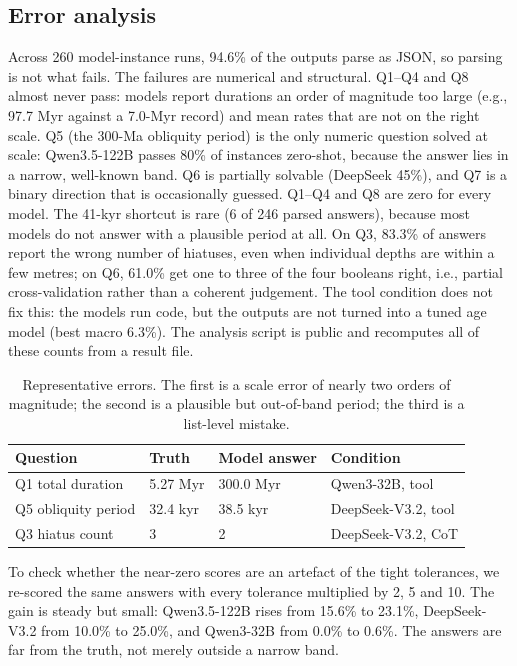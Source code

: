 \documentclass[10pt]{article}
\begin{document}
\subsection{Error analysis}
\label{sec:analysis}
Across 260 model-instance runs, 94.6\% of the outputs parse as JSON, so parsing is not what
fails. The failures are numerical and structural. Q1--Q4 and Q8 almost never pass: models
report durations an order of magnitude too large (e.g., 97.7 Myr against a 7.0-Myr record) and
mean rates that are not on the right scale. Q5 (the 300-Ma obliquity period) is the only numeric question
solved at scale: Qwen3.5-122B passes 80\% of instances zero-shot, because the answer lies in a
narrow, well-known band. Q6 is partially solvable (DeepSeek 45\%), and Q7 is a binary direction
that is occasionally guessed. Q1--Q4 and Q8 are zero for every model. The 41-kyr shortcut is rare (6 of 246
parsed answers), because most models do not answer with a plausible period at all. On Q3,
83.3\% of answers report the wrong number of hiatuses, even when individual depths are within
a few metres; on Q6, 61.0\% get one to three of the four booleans right, i.e., partial
cross-validation rather than a coherent judgement. The tool condition does not fix this: the
models run code, but the outputs are not turned into a tuned age model (best macro 6.3\%).
The analysis script is public and recomputes all of these counts from a result file.

\begin{table}[t]
\centering
\small
\begin{tabular}{@{}llll@{}}
\toprule
Question & Truth & Model answer & Condition \\
\midrule
Q1 total duration & 5.27 Myr & 300.0 Myr & Qwen3-32B, tool \\
Q5 obliquity period & 32.4 kyr & 38.5 kyr & DeepSeek-V3.2, tool \\
Q3 hiatus count & 3 & 2 & DeepSeek-V3.2, CoT \\
\bottomrule
\end{tabular}
\caption{Representative errors. The first is a scale error of nearly two orders of magnitude;
the second is a plausible but out-of-band period; the third is a list-level mistake.}
\label{tab:errors}
\end{table}
To check whether the near-zero scores are an artefact of the tight tolerances, we re-scored
the same answers with every tolerance multiplied by 2, 5 and 10. The gain is steady but
small: Qwen3.5-122B rises from 15.6\% to 23.1\%, DeepSeek-V3.2 from 10.0\% to 25.0\%, and
Qwen3-32B from 0.0\% to 0.6\%. The answers are far from the truth, not merely outside a
narrow band.
\end{document}
